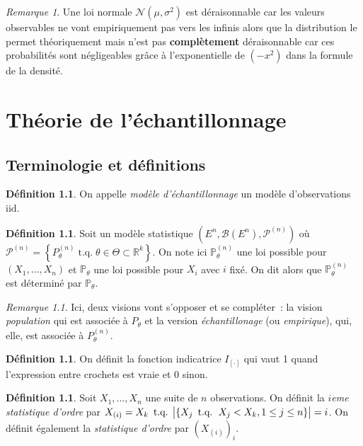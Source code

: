 \documentclass{report}
\DeclareMathOperator{\tq}{\text{ t.q. }}
\renewcommand{\P}{\mathbb P}
\newcommand{\statmod}[4]{\left(#1^{#4}, #2\left(#1^{#4}\right), #3^{\left(#4\right)}\right)}
\newcommand{\Nms}{\mathcal N(\mu, \sigma^2)}
\newcommand{\R}{\mathbb R}
\newcommand{\Brl}{\mathcal B}  %
\theoremstyle{definition}
\newtheorem{déf}[thm]{Définition}
\theoremstyle{remark}
\newtheorem*{rmq}{Remarque}
\begin{document}
	\begin{rmq} Une loi normale $\Nms$ est déraisonnable car les valeurs observables ne vont empiriquement pas vers les infinis alors que la distribution le
	permet théoriquement mais n'est pas \textbf{complètement} déraisonnable car ces probabilités sont négligeables grâce à l'exponentielle de $(-x^2)$ dans la
	formule de la densité.
	\end{rmq}

\chapter{Théorie de l'échantillonnage}
	\section{Terminologie et définitions}
		\begin{déf} On appelle \textit{modèle d'échantillonnage} un modèle d'observations iid.  \end{déf}

		\begin{déf} Soit un modèle statistique $\statmod E\Brl{\mathcal P}n$ où $\mathcal P^{(n)} =
		\left\{P_\theta^{(n)} \tq \theta \in \Theta \subset \R^k\right\}$. On note ici $\P^{(n)}_\theta$ une loi possible pour $(X_1, \ldots, X_n)$ et $\P_\theta$
		une loi possible pour $X_i$ avec $i$ fixé. On dit alors que $\P^{(n)}_\theta$ est déterminé par $\P_\theta$.
		\end{déf}

		\begin{rmq} Ici, deux visions vont s'opposer et se compléter~: la vision \textit{population} qui est associée à $P_\theta$ et la version
		\textit{échantillonage} (ou \textit{empirique}), qui, elle, est associée à $P_\theta^{(n)}$.
		\end{rmq}

		\begin{déf} On définit la fonction indicatrice $I_{[\cdot]}$ qui vaut 1 quand l'expression entre crochets est vraie et 0 sinon. \end{déf}

		\begin{déf} Soit $X_1, \ldots, X_n$ une suite de $n$ observations. On définit la \textit{$i$eme statistique d'ordre} par
		$X_{(i)} = X_k \tq \abs {\{X_j \tq X_j < X_k, 1 \leq j \leq n\}} = i$. On définit également la \textit{statistique d'ordre} par $\left(X_{(i)}\right)_i$.
		\end{déf}
\end{document}
